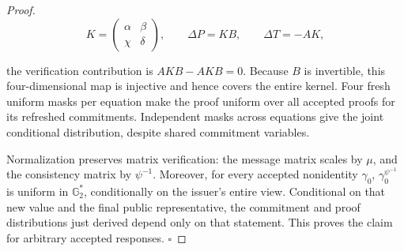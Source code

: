 \documentclass[11pt]{article}
\begin{document}
\begin{proof}
\[
K=\begin{pmatrix}\alpha&\beta\\\chi&\delta\end{pmatrix},\qquad
\Delta P=KB,\qquad \Delta T=-AK,
\tag{10}
\]

the verification contribution is \(AKB-AKB=0\). Because \(B\) is invertible, this four-dimensional map is injective and hence covers the entire kernel. Four fresh uniform masks per equation make the proof uniform over all accepted proofs for its refreshed commitments. Independent masks across equations give the joint conditional distribution, despite shared commitment variables.

Normalization preserves matrix verification: the message matrix scales by \(\mu\), and the consistency matrix by \(\psi^{-1}\). Moreover, for every accepted nonidentity \(\gamma_0\), \(\gamma_0^{\psi^{-1}}\) is uniform in \(\mathbb G_2^*\), conditionally on the issuer's entire view. Conditional on that new value and the final public representative, the commitment and proof distributions just derived depend only on that statement. This proves the claim for arbitrary accepted responses. \(\square\)

\end{proof}
\end{document}
